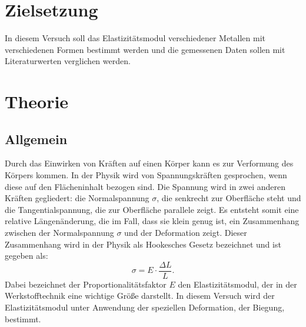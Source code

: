 \section{Zielsetzung}
\label{sec:Zielsetzung}

In diesem Versuch soll das Elastizitätsmodul verschiedener Metallen mit verschiedenen Formen bestimmt werden und die gemessenen Daten sollen mit Literaturwerten verglichen werden. 

\section{Theorie}
\label{sec:Theorie}

\subsection{Allgemein}
Durch das Einwirken von Kräften auf einen Körper kann es zur Verformung des Körpers kommen. In der Physik wird von Spannungskräften gesprochen, wenn diese auf den Flächeninhalt bezogen sind. Die Spannung wird in zwei anderen Kräften gegliedert: die Normalspannung $\sigma$, die senkrecht zur Oberfläche steht und die Tangentialspannung, die zur Oberfläche parallele zeigt. Es entsteht somit eine relative Längenänderung, die im Fall, dass sie klein genug ist, ein Zusammenhang zwischen der Normalspannung $\sigma$ und der Deformation zeigt. Dieser Zusammenhang wird in der Physik als Hookesches Gesetz bezeichnet und ist gegeben als: 
\begin{equation}
\label{eqn: Hooke}
\sigma = E \cdot \frac{\Delta L}{L}.
\end{equation}
Dabei bezeichnet der Proportionalitätsfaktor $E$ den Elastizitätsmodul, der in der Werkstofftechnik eine wichtige Größe darstellt.
In diesem Versuch wird der Elastizitätsmodul unter Anwendung der speziellen Deformation, der Biegung, bestimmt. 

